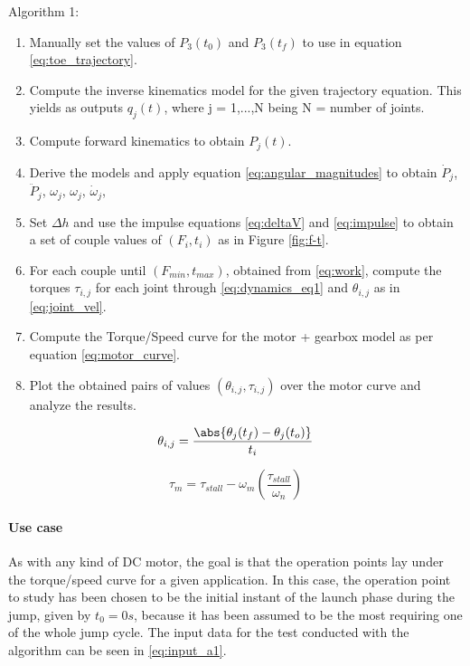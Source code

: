Algorithm 1:
\begin{enumerate}
\label{list:algorithm_1}
\item Manually set the values of $P_{3}(t_{0})$ and $P_{3}(t_{f})$ to use in equation \ref{eq:toe_trajectory}.
\item Compute the inverse kinematics model for the given trajectory equation. This yields as outputs $q_{j}(t)$, where j = 1,...,N being N = number of joints.
\item Compute forward kinematics to obtain $P_{j}(t)$.
\item Derive the models and apply equation \ref{eq:angular_magnitudes} to obtain $\dot{P}_{j}$, $\ddot{P}_{j}$, $\omega_{j}$, $\omega_{j}$, $\dot{\omega}_{j}$,
\item Set $\Delta h$ and use the impulse equations \ref{eq:deltaV} and \ref{eq:impulse} to obtain a set of couple values of $(F_{i}, t_{i})$ as in Figure \ref{fig:f-t}.
\item For each couple until $(F_{min}, t_{max})$, obtained from \ref{eq:work}, compute the torques $\tau_{i,j}$ for each joint through \ref{eq:dynamics_eq1} and $\theta_{i,j}$ as in \ref{eq:joint_vel}.
\item Compute the Torque/Speed curve for the motor + gearbox model as per equation \ref{eq:motor_curve}.
\item Plot the obtained pairs of values $(\theta_{i,j}, \tau_{i,j})$ over the motor curve and analyze the results.
\end{enumerate}

\begin{equation}
\label{eq:joint_vel}
	\theta_{i,j} =\frac{ \abs{ \theta_{j}(t_{f}) - \theta_{j}(t_{o}) } }{ t_{i} }
\end{equation}

\begin{equation}
\label{eq:motor_curve}
	\tau_{m} = \tau_{stall} - \omega_{m}\left(\frac{\tau_{stall}}{\omega_{n}}\right)
\end{equation}

\paragraph{Use case} %
\label{par:example_of_use}
As with any kind of DC motor, the goal is that the operation points lay under the torque/speed curve for a given application.
In this case, the operation point to study has been chosen to be the initial instant of the launch phase during the jump, given by $t_{0}=0s$, because it has been assumed to be the most requiring one of the whole jump cycle.
The input data for the test conducted with the algorithm can be seen in \ref{eq:input_a1}.

